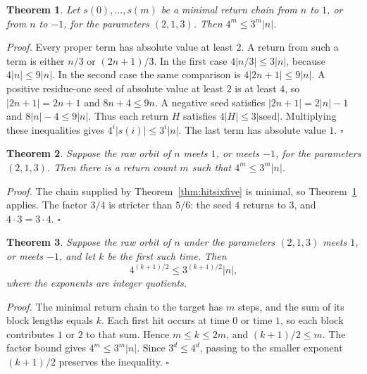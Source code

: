 \documentclass[11pt,letterpaper]{article}
\newtheorem{theorem}{Theorem}
\newenvironment{proof}{\noindent\textit{Proof.}}{\hfill\(\square\)}
\begin{document}
\begin{theorem}
\label{thm:fourthree}
Let \(s(0),\ldots,s(m)\) be a minimal return chain from \(n\) to \(1\), or from \(n\) to \(-1\), for the parameters \((2,1,3)\). Then \(4^{m}\le 3^{m}|n|\).
\end{theorem}

\begin{proof}
Every proper term has absolute value at least \(2\). A return from such a term is either \(n/3\) or \((2n+1)/3\). In the first case \(4|n/3|\le 3|n|\), because \(4|n|\le 9|n|\). In the second case the same comparison is \(4|2n+1|\le 9|n|\). A positive residue-one seed of absolute value at least \(2\) is at least \(4\), so \(|2n+1|=2n+1\) and \(8n+4\le 9n\). A negative seed satisfies \(|2n+1|=2|n|-1\) and \(8|n|-4\le 9|n|\). Thus each return \(H\) satisfies \(4|H|\le 3|\mathrm{seed}|\). Multiplying these inequalities gives \(4^{i}|s(i)|\le 3^{i}|n|\). The last term has absolute value \(1\).
\end{proof}

\begin{theorem}
\label{thm:hitfourthree}
Suppose the raw orbit of \(n\) meets \(1\), or meets \(-1\), for the parameters \((2,1,3)\). Then there is a return count \(m\) such that \(4^{m}\le 3^{m}|n|\).
\end{theorem}

\begin{proof}
The chain supplied by Theorem~\ref{thm:hitsixfive} is minimal, so Theorem~\ref{thm:fourthree} applies. The factor \(3/4\) is stricter than \(5/6\): the seed \(4\) returns to \(3\), and \(4\cdot 3=3\cdot 4\).
\end{proof}

\begin{theorem}
\label{thm:halftime}
Suppose the raw orbit of \(n\) under the parameters \((2,1,3)\) meets \(1\), or meets \(-1\), and let \(k\) be the first such time. Then
\[
4^{(k+1)/2}\le 3^{(k+1)/2}|n|,
\]
where the exponents are integer quotients.
\end{theorem}

\begin{proof}
The minimal return chain to the target has \(m\) steps, and the sum of its block lengths equals \(k\). Each first hit occurs at time \(0\) or time \(1\), so each block contributes \(1\) or \(2\) to that sum. Hence \(m\le k\le 2m\), and \((k+1)/2\le m\). The factor bound gives \(4^{m}\le 3^{m}|n|\). Since \(3^{d}\le 4^{d}\), passing to the smaller exponent \((k+1)/2\) preserves the inequality.
\end{proof}
\end{document}
